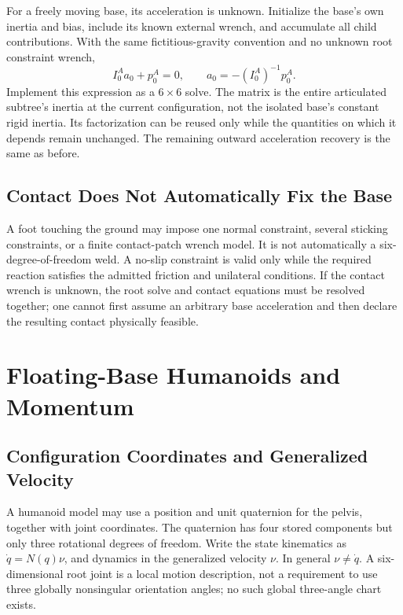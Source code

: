 For a freely moving base, its acceleration is unknown. Initialize the base's own inertia and bias, include its known external wrench, and accumulate all child contributions. With the same fictitious-gravity convention and no unknown root constraint wrench,
\begin{equation}
 I_0^A a_0+p_0^A=0,\qquad a_0=-(I_0^A)^{-1}p_0^A.
\end{equation}
Implement this expression as a $6\times6$ solve. The matrix is the entire articulated subtree's inertia at the current configuration, not the isolated base's constant rigid inertia. Its factorization can be reused only while the quantities on which it depends remain unchanged. The remaining outward acceleration recovery is the same as before.

\subsection{Contact Does Not Automatically Fix the Base}
\label{subsec:contact_constraints}

A foot touching the ground may impose one normal constraint, several sticking constraints, or a finite contact-patch wrench model. It is not automatically a six-degree-of-freedom weld. A no-slip constraint is valid only while the required reaction satisfies the admitted friction and unilateral conditions. If the contact wrench is unknown, the root solve and contact equations must be resolved together; one cannot first assume an arbitrary base acceleration and then declare the resulting contact physically feasible.

\section{Floating-Base Humanoids and Momentum}
\label{sec:floating_base_humanoid}

\subsection{Configuration Coordinates and Generalized Velocity}
\label{subsec:virtual_joint}

A humanoid model may use a position and unit quaternion for the pelvis, together with joint coordinates. The quaternion has four stored components but only three rotational degrees of freedom. Write the state kinematics as $\dot q=N(q)\nu$, and dynamics in the generalized velocity $\nu$. In general $\nu\ne\dot q$. A six-dimensional root joint is a local motion description, not a requirement to use three globally nonsingular orientation angles; no such global three-angle chart exists.

